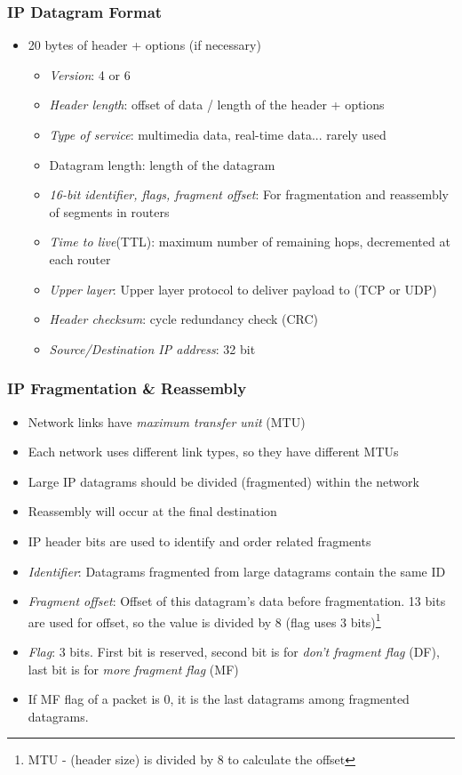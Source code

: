 \subsubsection{IP Datagram Format}
\begin{itemize}
	\item 20 bytes of header + options (if necessary)
	\begin{itemize}
		\item \textit{Version}: 4 or 6
		\item \textit{Header length}: offset of data / length of the header + options
		\item \textit{Type of service}: multimedia data, real-time data... rarely used
		\item Datagram length: length of the datagram
		\item \textit{16-bit identifier, flags, fragment offset}: For fragmentation and reassembly of segments in routers
		\item \textit{Time to live}(TTL): maximum number of remaining hops, decremented at each router
		\item \textit{Upper layer}: Upper layer protocol to deliver payload to (TCP or UDP)
		\item \textit{Header checksum}: cycle redundancy check (CRC)
		\item \textit{Source/Destination IP address}: 32 bit
	\end{itemize}
\end{itemize}

\subsubsection{IP Fragmentation \& Reassembly}
\begin{itemize}
	\item Network links have \textit{maximum transfer unit} (MTU) 
	\item Each network uses different link types, so they have different MTUs
	\item Large IP datagrams should be divided (fragmented) within the network
	\item Reassembly will occur at the final destination
	\item IP header bits are used to identify and order related fragments
	\item \textit{Identifier}: Datagrams fragmented from large datagrams contain the same ID
	\item \textit{Fragment offset}: Offset of this datagram's data before fragmentation. 13 bits are used for offset, so the value is divided by 8 (flag uses 3 bits)\footnote{MTU - (header size) is divided by 8 to calculate the offset}
	\item \textit{Flag}: 3 bits. First bit is reserved, second bit is for \textit{don't fragment flag} (DF), last bit is for \textit{more fragment flag} (MF)
	\item If MF flag of a packet is 0, it is the last datagrams among fragmented datagrams.
\end{itemize}

